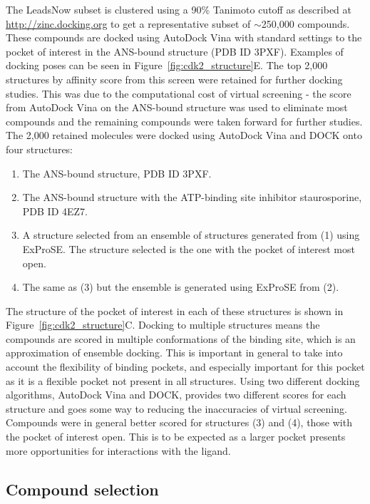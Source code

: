 The LeadsNow subset is clustered using a 90\% Tanimoto cutoff as described at \url{http://zinc.docking.org} to get a representative subset of $\sim$250,000 compounds.
These compounds are docked using AutoDock Vina \cite{Trott2010} with standard settings to the pocket of interest in the ANS-bound structure (PDB ID 3PXF).
Examples of docking poses can be seen in Figure~\ref{fig:cdk2_structure}E.
The top 2,000 structures by affinity score from this screen were retained for further docking studies.
This was due to the computational cost of virtual screening - the score from AutoDock Vina on the ANS-bound structure was used to eliminate most compounds and the remaining compounds were taken forward for further studies.
The 2,000 retained molecules were docked using AutoDock Vina and DOCK \cite{Allen2015} onto four structures:
\begin{enumerate}
\item The ANS-bound structure, PDB ID 3PXF.
\item The ANS-bound structure with the ATP-binding site inhibitor staurosporine, PDB ID 4EZ7.
\item A structure selected from an ensemble of structures generated from (1) using ExProSE.
The structure selected is the one with the pocket of interest most open.
\item The same as (3) but the ensemble is generated using ExProSE from (2).
\end{enumerate}
The structure of the pocket of interest in each of these structures is shown in Figure~\ref{fig:cdk2_structure}C.
Docking to multiple structures means the compounds are scored in multiple conformations of the binding site, which is an approximation of ensemble docking.
This is important in general to take into account the flexibility of binding pockets, and especially important for this pocket as it is a flexible pocket not present in all structures.
Using two different docking algorithms, AutoDock Vina and DOCK, provides two different scores for each structure and goes some way to reducing the inaccuracies of virtual screening.
Compounds were in general better scored for structures (3) and (4), those with the pocket of interest open.
This is to be expected as a larger pocket presents more opportunities for interactions with the ligand.


\subsection{Compound selection}

